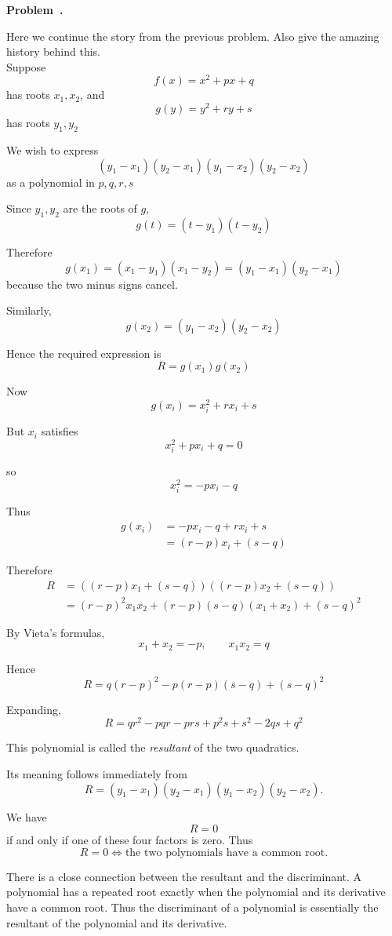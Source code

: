 \documentclass[10pt]{article}
\newcounter{problem}
\newenvironment{problem}[1][]{
  \refstepcounter{problem}
  \par\noindent\textbf{Problem~\theproblem. #1}\par
  \vspace{0.5em}
}{\vspace{1em}}
\begin{document}
\begin{problem} %
Here we continue the story from the previous problem. Also give the amazing history behind this.\\

Suppose
\[
f(x) =x^2 + px + q
\]
has roots $x_1,x_2$, and
\[
g(y) = y^2 + ry + s
\]
has roots $y_1,y_2$

We wish to express
\[
(y_1 - x_1) (y_2 - x_1) (y_1 - x_2) (y_2 - x_2)
\]
as a polynomial in $p,q,r,s$

Since $y_1,y_2$ are the roots of $g$,
\[
g(t) = (t - y_1) (t - y_2)
\]

Therefore
\[
g(x_1) = (x_1 - y_1) (x_1 - y_2) = (y_1 - x_1) (y_2 - x_1)
\]
because the two minus signs cancel.

Similarly,
\[
g(x_2) = (y_1 - x_2) (y_2 - x_2)
\]

Hence the required expression is
\[
R = g(x_1) g(x_2)
\]

Now
\[
g(x_i) = x_i^2 +rx_i + s
\]

But $x_i$ satisfies
\[
x_i^2 + px_i + q = 0
\]

so
\[
x_i^2 = -px_i - q
\]

Thus
\begin{align*}
g(x_i)
&= -px_i - q + rx_i + s\\
&= (r-p) x_i + (s-q)
\end{align*}

Therefore
\begin{align*}
R &=\left((r - p)x_1 + (s - q)\right) \left((r - p)x_2+(s - q)\right)\\
&=(r - p)^2x_1x_2 + (r - p)(s - q)(x_1 + x_2) + (s - q)^2
\end{align*}

By Vieta's formulas,
\[
x_1 + x_2 = -p, \qquad x_1x_2=q
\]

Hence
\[
R = q(r - p)^2 -p(r - p)(s - q) + (s - q)^2
\]

Expanding,
\[
R = qr^2 - pqr - prs + p^2s + s^2 - 2qs + q^2
\]

This polynomial is called the \emph{resultant} of the two quadratics.

Its meaning follows immediately from
\[
R = (y_1 - x_1)(y_2 - x_1)(y_1 - x_2)(y_2 - x_2).
\]

We have
\[
R=0
\]
if and only if one of these four factors is zero. Thus
\[
R = 0 \iff \text{the two polynomials have a common root}.
\]

There is a close connection between the resultant and the discriminant. A polynomial has a repeated root exactly when the polynomial and its derivative have a common root. Thus the
discriminant of a polynomial is essentially the resultant of the polynomial and its derivative.\\\\



\end{problem}
\end{document}
